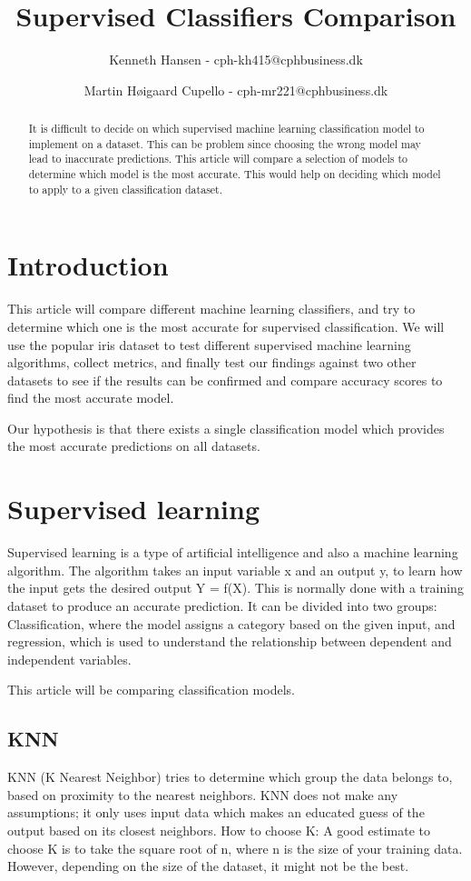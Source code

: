 \documentclass{article}
\author{Kenneth Hansen - cph-kh415@cphbusiness.dk
    \and Martin Høigaard Cupello - cph-mr221@cphbusiness.dk}
\title{Supervised Classifiers Comparison}
\begin{document}
\maketitle
\thispagestyle{empty}

\begin{abstract}
  \noindent It is difficult to decide on which supervised machine learning classification model to implement on a dataset.
  This can be problem since choosing the wrong model may lead to inaccurate predictions.
  This article will compare a selection of models to determine which model is the most accurate.
  This would help on deciding which model to apply to a given classification dataset.
\end{abstract}
\tableofcontents
\clearpage



\section{Introduction}
This article will compare different machine learning classifiers, and try to determine which one is the most accurate for supervised classification. We will use the popular iris dataset to test different supervised machine learning algorithms, collect metrics, and finally test our findings against two other datasets to see if the results can be confirmed and compare accuracy scores to find the most accurate model.

\bigskip

\noindent Our hypothesis is that there exists a single classification model which provides the most accurate predictions on all datasets.

\section{Supervised learning}
Supervised learning is a type of artificial intelligence and also a machine learning algorithm. The algorithm takes an input variable x and an output y, to learn how the input gets the desired output Y = f(X). This is normally done with a training dataset to produce an accurate prediction. It can be divided into two groups: Classification, where the model assigns a category based on the given input,  and regression, which is used to understand the relationship between dependent and independent variables.

\noindent This article will be comparing classification models.

\subsection{KNN}
KNN (K Nearest Neighbor) tries to determine which group the data belongs to, based on proximity to the nearest neighbors.
KNN does not make any assumptions; it only uses input data which makes an educated guess of the output based on its closest neighbors.
How to choose K:
A good estimate to choose K is to take the square root of n, where n is the size of your training data. However, depending on the size of the dataset, it might not be the best.
\end{document}
